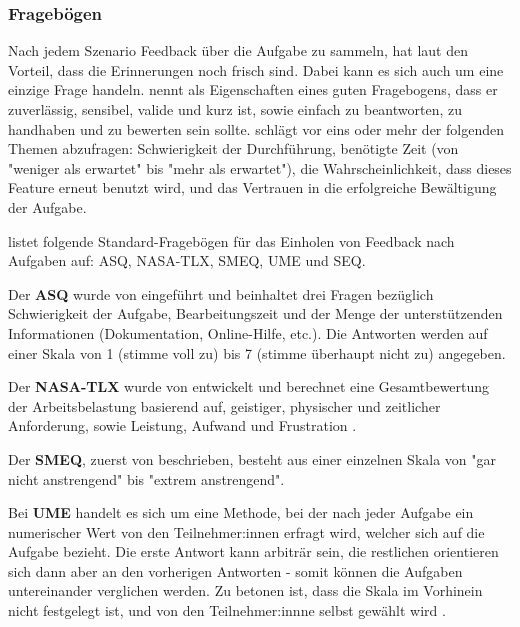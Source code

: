 \subsubsection{Fragebögen}

Nach jedem Szenario Feedback über die Aufgabe zu sammeln, hat laut \textcite{barnumUsabilityTesting2021} den Vorteil, dass die Erinnerungen noch frisch sind. Dabei kann es sich auch um eine einzige Frage handeln. \textcite{sauroIfYou2010} nennt als Eigenschaften eines guten Fragebogens, dass er zuverlässig, sensibel, valide und kurz ist, sowie einfach zu beantworten, zu handhaben und zu bewerten sein sollte. \textcite{barnumUsabilityTesting2021} schlägt vor eins oder mehr der folgenden Themen abzufragen: Schwierigkeit der Durchführung, benötigte Zeit (von "weniger als erwartet" bis "mehr als erwartet"), die Wahrscheinlichkeit, dass dieses Feature erneut benutzt wird, und das Vertrauen in die erfolgreiche Bewältigung der Aufgabe.

\textcite{sauroIfYou2010} listet folgende Standard-Fragebögen für das Einholen von Feedback nach Aufgaben auf: \ac{ASQ}, \ac{NASA-TLX}, \ac{SMEQ}, \ac{UME} und \ac{SEQ}.

\vspace{\baselineskip}

Der \textbf{\ac{ASQ}} wurde von \textcite{lewisPsychometricEvaluation1991} eingeführt und beinhaltet drei Fragen bezüglich Schwierigkeit der Aufgabe, Bearbeitungszeit und der Menge der unterstützenden Informationen (Dokumentation, Online-Hilfe, etc.). Die Antworten werden auf einer Skala von 1 (stimme voll zu) bis 7 (stimme überhaupt nicht zu) angegeben.

\vspace{\baselineskip}

Der \textbf{\ac{NASA-TLX}} wurde von \textcite{hartDevelopmentNASATLX1988} entwickelt und berechnet eine Gesamtbewertung der Arbeitsbelastung basierend auf, geistiger, physischer und zeitlicher Anforderung, sowie Leistung, Aufwand und Frustration \parencite{nasaNASATLX}.

\vspace{\baselineskip}

Der \textbf{\ac{SMEQ}}, zuerst von \textcite{zijlstraConstructionScale1985} beschrieben, besteht aus einer einzelnen Skala von "gar nicht anstrengend" bis "extrem anstrengend". 

\vspace{\baselineskip}

Bei \textbf{\ac{UME}} handelt es sich um eine Methode, bei der nach jeder Aufgabe ein numerischer Wert von den Teilnehmer:innen erfragt wird, welcher sich auf die Aufgabe bezieht. Die erste Antwort kann arbiträr sein, die restlichen orientieren sich dann aber an den vorherigen Antworten - somit können die Aufgaben untereinander verglichen werden. Zu betonen ist, dass die Skala im Vorhinein nicht festgelegt ist, und von den Teilnehmer:innne selbst gewählt wird \parencite{mcgeeUsabilityMagnitude2003}.

